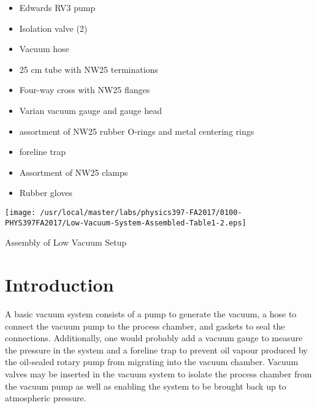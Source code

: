 \begin{minipage}[t]{0.5\textwidth}
\begin{itemize}[noitemsep]
\item Edwards RV3 pump
\item Isolation valve (2)
\item Vacuum hose
\item 25 cm tube with NW25 terminations
\item Four-way cross with NW25 flanges
\end{itemize}
\end{minipage}
\begin{minipage}[t]{0.5\textwidth}
\begin{itemize}[noitemsep]
\item Varian vacuum gauge and gauge head
\item assortment of NW25 rubber O-rings and metal centering rings
\item foreline trap
\item Assortment of NW25 clamps
\item Rubber gloves
\end{itemize}
\end{minipage}

\begin{marginfigure}
\texttt{[image: /usr/local/master/labs/physics397-FA2017/0100-PHYS397FA2017/Low-Vacuum-System-Assembled-Table1-2.eps]}
\caption{Assembly of Low Vacuum Setup}
\label{fig:VACsetup5}
\end{marginfigure}

\section{Introduction}

A basic vacuum system consists of a pump to generate the vacuum, a hose to connect the vacuum pump to the process chamber, and gaskets to seal the connections. Additionally, one would probably add a vacuum gauge to measure the pressure in the system and a foreline trap to prevent oil vapour produced by the oil-sealed rotary pump from migrating into the vacuum chamber. Vacuum valves may be inserted in the vacuum system to isolate the process chamber from the vacuum pump as well as enabling the system to be brought back up to atmospheric pressure.  

